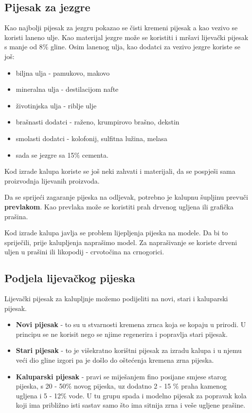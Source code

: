 \documentclass[a4paper,12pt]{article}
\numberwithin{figure}{section}
\begin{document}
\subsection{Pijesak za jezgre}
Kao najbolji pijesak za jezgru pokazao se čisti kremeni pijesak a kao vezivo se koristi laneno ulje. Kao materijal jezgre može se koristiti i mršavi lijevački pijesak s manje od 8$\%$ gline. Osim lanenog ulja, kao dodatci za vezivo jezgre koriste se još:
\begin{itemize}
\item biljna ulja - pamukovo, makovo
\item mineralna ulja - destilacijom nafte
\item životinjska ulja - riblje ulje
\item brašnasti dodatci - raženo, krumpirovo brašno, dekstin
\item smolasti dodatci - kolofonij, sulfitna lužina, melasa
\item sada se jezgre sa 15$\%$ cementa.
\end{itemize}
Kod izrade kalupa koriste se još neki zahvati i materijali, da se pospješi sama proizvodnja lijevanih proizvoda.\par
Da se sprijeći zagaranje pijeska na odljevak, potrebno je kalupnu  šupljinu prevuči \textbf{prevlakom}. Kao prevlaka može se koristiti prah drvenog ugljena ili grafička prašina.\par
Kod izrade kalupa javlja se problem lijepljenja pijeska na modele. Da bi to spriječili, prije kalupljenja naprašimo model. Za naprašivanje se koriste drveni uljen u prašini ili likopodij - crvotočina na crnogorici.
\subsection{Podjela lijevačkog pijeska}
Lijevački pijesak za kalupljnje možemo podijeliti na novi, stari i kaluparski pijesak.
\begin{itemize}
\item \textbf{Novi pijesak} - to su u stvarnosti kremena zrnca koja se kopaju u prirodi. U principu se ne korisit nego se njime regenerira i popravlja stari pijesak.
\item \textbf{Stari pijesak} - to je višekratno korištni pijesak za izradu kalupa i u njemu veći dio gline izgori pa je došlo do oštećenja kremena zrna pijeska.
\item \textbf{Kaluparski pijesak} - pravi se miješanjem fino posijane smjese starog pijeska, s 20 - 50$\%$ novog pijeska, uz dodatno 2 - 15 $\%$ praha kamenog ugljena i 5 - 12$\%$  vode. U tu grupu spada i modelno pijesak za popravak kola koji ima približno isti sastav samo što ima sitnija zrna i veše ugljene prašine.
\end{itemize}
\end{document}
